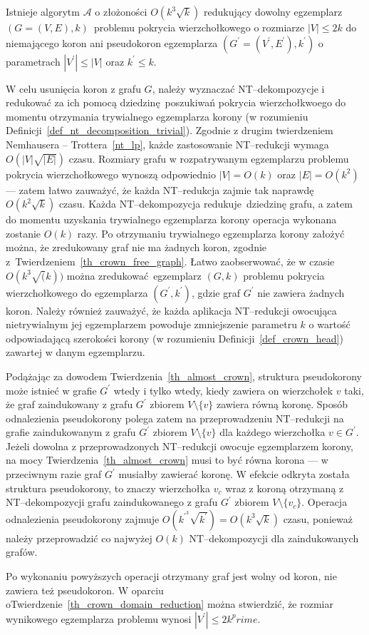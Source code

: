 {  \begin{theorem}
    Istnieje algorytm $\mathcal{A}$ o złożoności $O(k^3\sqrt{k})$ redukujący dowolny egzemplarz $(G=(V, E), k)$ problemu pokrycia wierzchołkowego o rozmiarze $|V|\leq 2k$ do niemającego koron ani pseudokoron egzemplarza $(G^\prime=(V^\prime, E^\prime), k^\prime)$ o parametrach $|V^\prime| \leq |V|$ oraz $k^\prime \leq k$.
  \end{theorem}
  \begin{bproof}
    W celu usunięcia koron z grafu $G$, należy wyznaczać NT--dekompozycje i redukować za ich pomocą dziedzinę poszukiwań pokrycia wierzchołkwoego do momentu otrzymania trywialnego egzemplarza korony (w rozumieniu Definicji~\ref{def_nt_decomposition_trivial}).
    Zgodnie z drugim twierdzeniem Nemhausera -- Trottera~\ref{nt_lp}, każde zastosowanie NT--redukcji wymaga $O(|V|\sqrt{|E|})$ czasu.
    Rozmiary grafu w rozpatrywanym egzemplarzu problemu pokrycia wierzchołkowego wynoszą odpowiednio $|V|=O(k)$ oraz $|E|=O(k^2)$ --- zatem łatwo zauważyć, że każda NT--redukcja zajmie tak naprawdę $O(k^2\sqrt{k})$ czasu.
    Każda NT--dekompozycja redukuje dziedzinę grafu, a zatem do momentu uzyskania trywialnego egzemplarza korony operacja wykonana zostanie $O(k)$ razy.
    Po otrzymaniu trywialnego egzemplarza korony założyć można, że zredukowany graf nie ma żadnych koron, zgodnie z~Twierdzeniem~\ref{th_crown_free_graph}.
    Łatwo zaobserwować, że w czasie $O(k^3\sqrt(k))$ można zredukować egzemplarz $(G, k)$ problemu pokrycia wierzchołkowego do egzemplarza $(G^\prime, k^\prime)$, gdzie graf $G^\prime$ nie zawiera żadnych koron.
    Należy również zauważyć, że każda aplikacja NT--redukcji owocująca nietrywialnym jej egzemplarzem powoduje zmniejszenie parametru $k$ o wartość odpowiadającą szerokości korony (w rozumieniu Definicji~\ref{def_crown_head}) zawartej w danym egzemplarzu.

    Podążając za dowodem Twierdzenia~\ref{th_almost_crown}, struktura pseudokorony może istnieć w grafie $G^\prime$ wtedy i tylko wtedy, kiedy zawiera on wierzchołek $v$ taki, że graf zaindukowany z grafu $G^\prime$ zbiorem $V \setminus \{v\}$ zawiera równą koronę.
    Sposób odnalezienia pseudokorony polega zatem na przeprowadzeniu NT--redukcji na grafie zaindukowanym z grafu $G^\prime$ zbiorem $V \setminus \{v\}$ dla każdego wierzchołka $v \in G^\prime$.
    Jeżeli dowolna z przeprowadzonych NT--redukcji owocuje egzemplarzem korony, na mocy Twierdzenia~\ref{th_almost_crown} musi to być równa korona --- w przeciwnym razie graf $G^\prime$ musiałby zawierać koronę.
    W efekcie odkryta została struktura pseudokorony, to znaczy wierzchołka $v_c$ wraz z koroną otrzymaną z NT--dekompozycji grafu zaindukowanego z grafu $G^\prime$ zbiorem $V \setminus \{v_c\}$.
    Operacja odnalezienia pseudokorony zajmuje $O(k^{\prime}^3\sqrt{k^\prime})=O(k^3\sqrt{k})$ czasu, ponieważ należy przeprowadzić co najwyżej $O(k)$ NT--dekompozycji dla zaindukowanych grafów.

    Po wykonaniu powyższych operacji otrzymany graf jest wolny od koron, nie zawiera też pseudokoron.
    W oparciu  oTwierdzenie~\ref{th_crown_domain_reduction} można stwierdzić, że rozmiar wynikowego egzemplarza problemu wynosi $|V^\prime| \leq 2k^prime$.
  \end{bproof}
}
